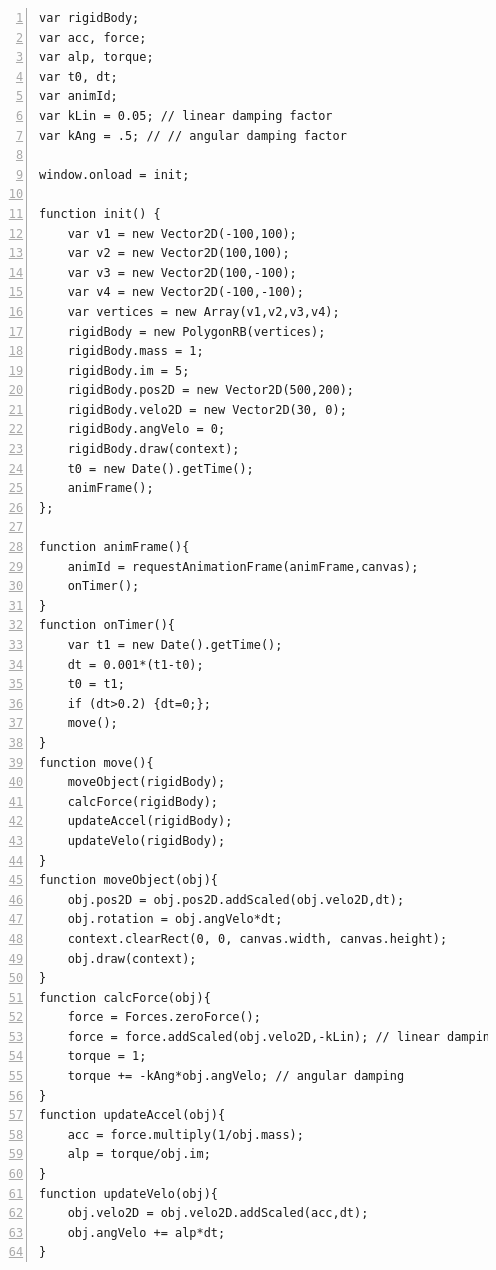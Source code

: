 \vspace{5mm}
\begin{lstlisting}[breaklines=true, frame=single, numbers=left, caption=Code for angular rotation simulation, label=lst:angularrotation]
var rigidBody;
var acc, force;	
var alp, torque;
var t0, dt;
var animId;
var kLin = 0.05; // linear damping factor	
var kAng = .5; // // angular damping factor	

window.onload = init; 

function init() {
	var v1 = new Vector2D(-100,100);
	var v2 = new Vector2D(100,100);
	var v3 = new Vector2D(100,-100);
	var v4 = new Vector2D(-100,-100);
	var vertices = new Array(v1,v2,v3,v4);
	rigidBody = new PolygonRB(vertices);
	rigidBody.mass = 1;
	rigidBody.im = 5;
	rigidBody.pos2D = new Vector2D(500,200);	
	rigidBody.velo2D = new Vector2D(30, 0);			
	rigidBody.angVelo = 0;	
	rigidBody.draw(context);
	t0 = new Date().getTime(); 
	animFrame();
};

function animFrame(){
	animId = requestAnimationFrame(animFrame,canvas);
	onTimer(); 
}
function onTimer(){
	var t1 = new Date().getTime(); 
	dt = 0.001*(t1-t0); 
	t0 = t1;
	if (dt>0.2) {dt=0;};	
	move();
}
function move(){			
	moveObject(rigidBody);
	calcForce(rigidBody);
	updateAccel(rigidBody);
	updateVelo(rigidBody);
}
function moveObject(obj){
	obj.pos2D = obj.pos2D.addScaled(obj.velo2D,dt);	
	obj.rotation = obj.angVelo*dt;
	context.clearRect(0, 0, canvas.width, canvas.height);
	obj.draw(context);	
}
function calcForce(obj){
	force = Forces.zeroForce();
	force = force.addScaled(obj.velo2D,-kLin); // linear damping
	torque = 1;
	torque += -kAng*obj.angVelo; // angular damping 	
}	
function updateAccel(obj){
	acc = force.multiply(1/obj.mass);
	alp = torque/obj.im;
}	
function updateVelo(obj){
	obj.velo2D = obj.velo2D.addScaled(acc,dt);	
	obj.angVelo += alp*dt;	
}
\end{lstlisting}

